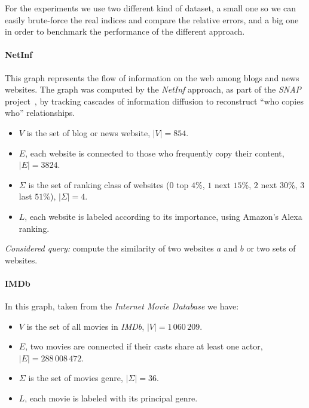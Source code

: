     For the experiments we use two different kind of dataset, a small one so we can easily brute-force the real indices and compare the relative errors, and a big one in order to benchmark the performance of the different approach.
    
    \paragraph*{NetInf} This graph represents the flow of information on the web among blogs and news websites. The graph was computed by the \textit{NetInf} approach, as part of the \textit{SNAP} project~\cite{netinf}, by tracking cascades of information diffusion to reconstruct ``who copies who'' relationships.
    
    \begin{itemize}
    	\item $V$ is the set of blog or news website, $|V| = 854$.
    	\item $E$, each website is connected to those who frequently copy their content, $|E| = 3824$.
    	\item $\Sigma$ is the set of ranking class of websites ($0$ top $4\%$, $1$ next $15\%$, $2$ next $30\%$, $3$ last $51\%$), $|\Sigma| = 4$.
    	\item $L$, each website is labeled according to its importance, using Amazon's Alexa ranking.
    \end{itemize}

    
    \textsl{Considered query:} compute the similarity of two websites $a$ and $b$ or two sets of websites.
    
    \paragraph*{IMDb} In this graph, taken from the \textit{Internet Movie Database} we have:
    
    \begin{itemize}
    	\item $V$ is the set of all movies in \textit{IMDb},  $|V| = 1\,060\,209$.
		\item $E$, two movies are connected if their casts share at least one actor, $|E| = 288\,008\,472$.
		\item $\Sigma$ is the set of movies genre, $|\Sigma| = 36$.
		\item $L$, each movie is labeled with its principal genre.
    \end{itemize}
    
